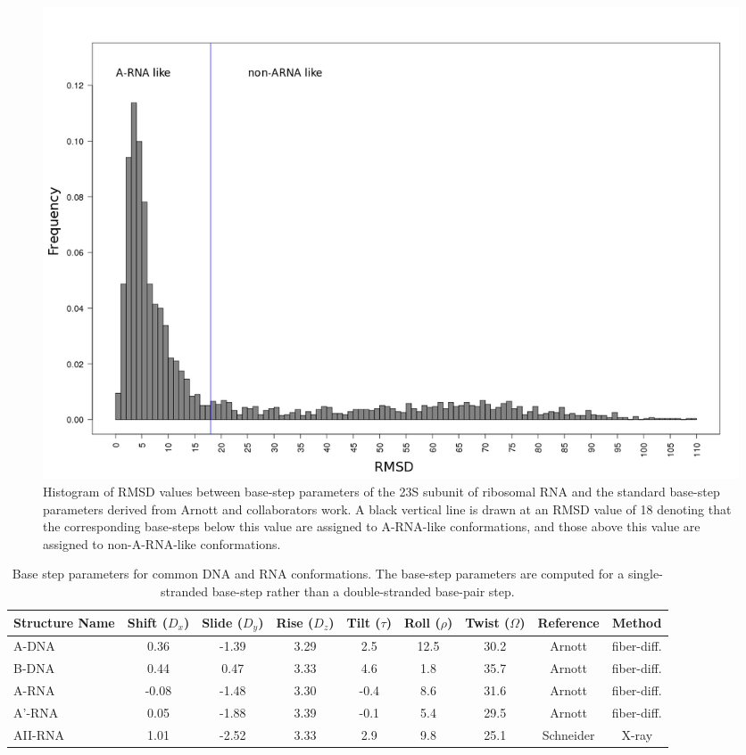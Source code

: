 \begin{figure}[ht]
 \centering
\includegraphics[angle=0, scale=0.38]{Chapter2/dormsd.png}
\caption{Histogram of RMSD values  between base-step parameters of the
  23S subunit  of ribosomal RNA and the  standard base-step parameters
  derived  from  Arnott and  collaborators  \cite{arnott1973} work.  A
  black vertical  line is drawn at  an RMSD value of  18 denoting that
  the  corresponding  base-steps  below  this value  are  assigned  to
  A-RNA-like conformations, and those above this value are assigned to
  non-A-RNA-like conformations.}
 \label{fig:dormsd}
\end{figure}

\begin{table}[ht]
\centering
\small\addtolength{\tabcolsep}{-2pt}
\begin{tabular}{p{1.4cm}|c|c|c|c|c|c|c|c}
\hline
\textbf{Structure Name} & Shift ($D_x$) & Slide ($D_y$) & Rise ($D_z$) & Tilt
($\tau$) & Roll ($\rho$) & Twist ($\Omega$) & \textbf{Reference} &
\textbf{Method} \\ \hline
A-DNA & 0.36 & -1.39 & 3.29 & 2.5 & 12.5 & 30.2 & Arnott
\cite{arnott1999} & fiber-diff. \\ \hline
B-DNA & 0.44 & 0.47 & 3.33 & 4.6 & 1.8 & 35.7   & Arnott
\cite{arnott1999} & fiber-diff. \\ \hline
A-RNA & -0.08 & -1.48 & 3.30 & -0.4 & 8.6 & 31.6 & Arnott
\cite{arnott1999} & fiber-diff. \\ \hline
A'-RNA & 0.05 & -1.88 & 3.39 & -0.1 & 5.4 & 29.5 & Arnott
\cite{arnott1999} & fiber-diff. \\ \hline
AII-RNA & 1.01 & -2.52 & 3.33 & 2.9 & 9.8 & 25.1 & Schneider
\cite{schneider2004} & X-ray \\ \hline
\end{tabular}
\caption{Base    step   parameters    for   common    DNA    and   RNA
  conformations.   The  base-step  parameters   are  computed   for  a
  single-stranded  base-step rather  than a  double-stranded base-pair
  step.}
\label{tab:conf}
\end{table}

